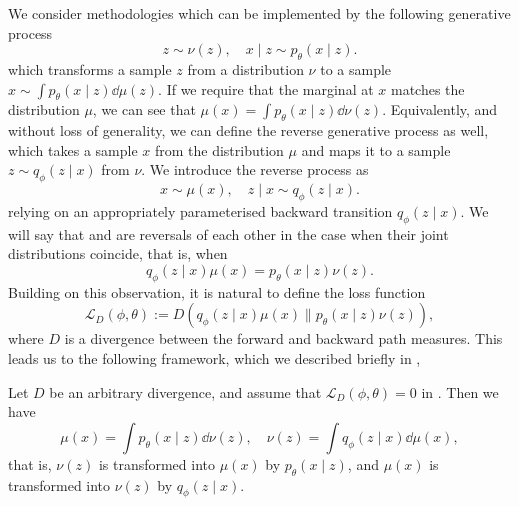 We consider methodologies which can be implemented by the following generative process\label{ntn:base_distbn_cmcd}
\[
    z \sim \nu(z), \quad x \mid z \sim p_{\theta}(x \mid z). \label{eq:unifying_framework_discrete}
\]
which transforms a sample $z$ from a distribution $\nu$ to a sample $x \sim \int p_{\theta}(x \mid z)  \dd \mu(z)$. If we require that the marginal at $x$ matches the distribution $\mu$, we can see that $\mu(x) = \int p_{\theta}(x \mid z) \dd \nu(z)$.\label{ntn:mappings}
Equivalently, and without loss of generality, we can define the reverse generative process as well, which takes a sample $x$ from the distribution $\mu$ and maps it to a sample $z \sim q_{\phi}(z \mid x)$ from $\nu$. 
We introduce the reverse process as
\[
x \sim \mu(x), \quad z \mid x \sim q_{\phi}(z \mid x). \label{eq:unifying_framework_reverse}
\]
relying on an appropriately parameterised backward transition $q_{\phi}(z \mid x)$. We will say that  and  are reversals of each other in the case when their joint distributions coincide, that is, when
\[
    q_{\phi}(z \mid x) \mu(x) = p_{\theta}(x \mid z) \nu(z).
\]
Building on this observation, it is natural to define the loss function
\[
    \mathcal{L}_D(\phi, \theta) := D\left(q_{\phi}(z \mid x) \mu(x) \| p_{\theta}(x \mid z) \nu(z)\right), \label{eq:unifying_framework_loss}
\]
where $D$ is a divergence between the forward and backward path measures. This leads us to the following framework, which we described briefly in ,

\begin{selfframework}{}
    \label{framework:unifying_framework_discrete}
    Let $D$ be an arbitrary divergence, and assume that $\mathcal{L}_D(\phi, \theta)=0$ in . Then we have  
    \[
        \mu(x) = \int p_{\theta}(x \mid z) \dd \nu(z), \quad \nu(z) = \int q_{\phi}(z \mid x) \dd \mu(x), \label{eq:unifying_framework_discrete_result}
    \]
    that is, $\nu(z)$ is transformed into $\mu(x)$ by $p_{\theta}(x \mid z)$, and $\mu(x)$ is transformed into $\nu(z)$ by $q_{\phi}(z \mid x)$.
\end{selfframework}


